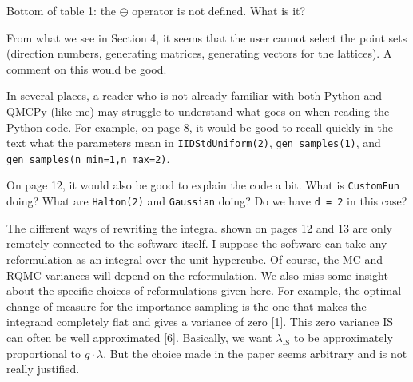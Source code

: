 \documentclass{amsart}
\begin{document}

\vspace{1cm}

Bottom of table 1: the 	$\ominus$ operator is not defined. What is it?


\vspace{1cm}

From what we see in Section 4, it seems that the user cannot select the point sets (direction numbers, generating matrices, generating vectors for the lattices). A comment on this would be good. 

\vspace{1cm}

In several places, a reader who is not already familiar with both Python and QMCPy (like me) may struggle to understand what goes on when reading the Python code. For example, on page 8, it would be good to recall quickly in the text what the parameters mean in \texttt{IIDStdUniform(2)}, \texttt{gen\_samples(1)}, and \texttt{gen\_samples(n min=1,n max=2)}.

\vspace{1cm}

On page 12, it would also be good to explain the code a bit. What is \texttt{CustomFun} doing? What are \texttt{Halton(2)} and \texttt{Gaussian} doing? Do we have \texttt{d = 2} in this case?

\vspace{1cm}

The different ways of rewriting the integral shown on pages 12 and 13 are only remotely connected to the software itself. I suppose the software can take any reformulation as an integral over the unit hypercube. Of course, the MC and RQMC variances will depend on the reformulation. We also miss some insight about the specific choices of reformulations given here. For example, the optimal change of measure for the importance sampling is the one that makes the integrand completely flat and gives a variance of zero [1]. This zero variance IS can often be well approximated [6]. Basically, we want $\lambda_\text{IS}$ to be approximately proportional to $g \cdot \lambda$. But the choice made in the paper seems arbitrary and is not really justified.
\end{document}
